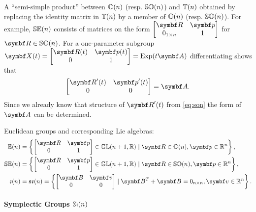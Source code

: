 A ``semi-simple product'' between ${\mathbb{O}(n)}$ (resp. ${\mathbb{SO}(n)}$) and ${\mathbb{T}(n)}$ obtained by replacing the identity matrix in ${\mathbb{T}(n)}$ by a member of ${\mathbb{O}(n)}$ (resp. ${\mathbb{SO}(n)}$). For example, ${\mathbb{SE}(n)}$ consists of matrices on the form $ \begin{bmatrix} \bR & \bp \\ 0_{1 \times n} & 1 \end{bmatrix} $ for $\bR \in \SOn$. For a one-parameter subgroup $\X(t) = \begin{bmatrix} \bR(t) & \bp(t) \\ 0 & 1 \end{bmatrix} = \Exp(t \A)$ differentiating shows that
\begin{equation}
  \begin{bmatrix} \bR'(t) & \bp'(t) \\ 0 & 0 \end{bmatrix} = \A.
\end{equation}
Since we already know that structure of $\bR'(t)$ from \eqref{eq:son} the form of $\A$ can be determined.
\begin{important}
  Euclidean groups and corresponding Lie algebras:
  \begin{subequations}
    \begin{align}
      \En  & = \left\{\begin{bmatrix} \bR & \bp \\ 0 & 1 \end{bmatrix} \in \GL(n+1, \mathbb{R}) \mid \bR \in \On, \bp \in \mathbb{R}^{n} \right\},  \\
      \SEn & = \left\{\begin{bmatrix} \bR & \bp \\ 0 & 1 \end{bmatrix} \in \GL(n+1, \mathbb{R}) \mid \bR \in \SOn, \bp \in \mathbb{R}^{n} \right\}, \\
      \en  & = \sen = \left\{\begin{bmatrix} \B & \bv \\ 0 & 0 \end{bmatrix} \mid \B^{T} + \B = 0_{n \times n}, \bv \in \mathbb{R}^{n} \right\}.
    \end{align}
  \end{subequations}
\end{important}

\paragraph{Symplectic Groups ${\mathbb{Sp}(n)}$}

